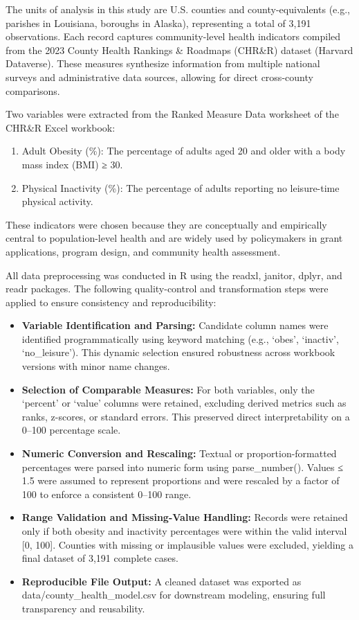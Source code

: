 \documentclass[
  letterpaper,
  DIV=11,
  numbers=noendperiod]{scrartcl}
\begin{document}
The units of analysis in this study are U.S. counties and
county-equivalents (e.g., parishes in Louisiana, boroughs in Alaska),
representing a total of 3,191 observations. Each record captures
community-level health indicators compiled from the 2023 County Health
Rankings \& Roadmaps (CHR\&R) dataset (Harvard Dataverse). These
measures synthesize information from multiple national surveys and
administrative data sources, allowing for direct cross-county
comparisons.

Two variables were extracted from the Ranked Measure Data worksheet of
the CHR\&R Excel workbook:

\begin{enumerate}
\def\labelenumi{\arabic{enumi}.}
\item
  Adult Obesity (\%): The percentage of adults aged 20 and older with a
  body mass index (BMI) ≥ 30.
\item
  Physical Inactivity (\%): The percentage of adults reporting no
  leisure-time physical activity.
\end{enumerate}

These indicators were chosen because they are conceptually and
empirically central to population-level health and are widely used by
policymakers in grant applications, program design, and community health
assessment.

All data preprocessing was conducted in R using the readxl, janitor,
dplyr, and readr packages. The following quality-control and
transformation steps were applied to ensure consistency and
reproducibility:

\begin{itemize}
\item
  \textbf{Variable Identification and Parsing:} Candidate column names
  were identified programmatically using keyword matching (e.g., `obes',
  `inactiv', `no\_leisure'). This dynamic selection ensured robustness
  across workbook versions with minor name changes.
\item
  \textbf{Selection of Comparable Measures:} For both variables, only
  the `percent' or `value' columns were retained, excluding derived
  metrics such as ranks, z-scores, or standard errors. This preserved
  direct interpretability on a 0--100 percentage scale.
\item
  \textbf{Numeric Conversion and Rescaling:} Textual or
  proportion-formatted percentages were parsed into numeric form using
  parse\_number(). Values ≤ 1.5 were assumed to represent proportions
  and were rescaled by a factor of 100 to enforce a consistent 0--100
  range.
\item
  \textbf{Range Validation and Missing-Value Handling:} Records were
  retained only if both obesity and inactivity percentages were within
  the valid interval {[}0, 100{]}. Counties with missing or implausible
  values were excluded, yielding a final dataset of 3,191 complete
  cases.
\item
  \textbf{Reproducible File Output:} A cleaned dataset was exported as
  data/county\_health\_model.csv for downstream modeling, ensuring full
  transparency and reusability.
\end{itemize}
\end{document}
